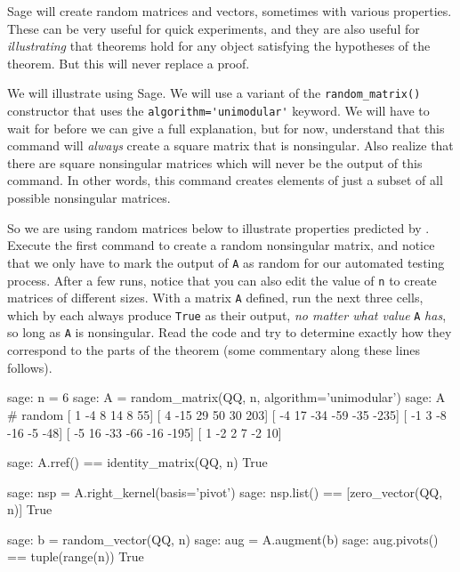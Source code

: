 Sage will create random matrices and vectors, sometimes with various properties.  These can be very useful for quick experiments, and they are also useful for \emph{illustrating} that theorems hold for any object satisfying the hypotheses of the theorem.  But this will never replace a proof.\par
%
We will illustrate  using Sage.  We will use a variant of the \verb?random_matrix()? constructor that uses the \verb?algorithm='unimodular'? keyword.  We will have to wait for  before we can give a full explanation, but for now, understand that this command will \emph{always} create a square matrix that is nonsingular.  Also realize that there are square nonsingular matrices which will never be the output of this command.  In other words, this command creates elements of just a subset of all possible nonsingular matrices.\par
%
So we are using random matrices below to illustrate properties predicted by .  Execute the first command to create a random nonsingular matrix, and notice that we only have to mark the output of \verb?A? as random for our automated testing process.  After a few runs, notice that you can also edit the value of \verb?n? to create matrices of different sizes.  With a matrix \verb?A? defined, run the next three cells, which by  each always produce \verb?True? as their output, \emph{no matter what value} \verb?A? \emph{has}, so long as \verb"A" is nonsingular.  Read the code and try to determine exactly how they correspond to the parts of the theorem (some commentary along these lines follows).
%
\begin{sageexample}
sage: n = 6
sage: A = random_matrix(QQ, n, algorithm='unimodular')
sage: A               # random
[   1   -4    8   14    8   55]
[   4  -15   29   50   30  203]
[  -4   17  -34  -59  -35 -235]
[  -1    3   -8  -16   -5  -48]
[  -5   16  -33  -66  -16 -195]
[   1   -2    2    7   -2   10]
\end{sageexample}
%
\begin{sageexample}
sage: A.rref() == identity_matrix(QQ, n)
True
\end{sageexample}
%
\begin{sageexample}
sage: nsp = A.right_kernel(basis='pivot')
sage: nsp.list() == [zero_vector(QQ, n)]
True
\end{sageexample}
%
\begin{sageexample}
sage: b = random_vector(QQ, n)
sage: aug = A.augment(b)
sage: aug.pivots() == tuple(range(n))
True
\end{sageexample}
